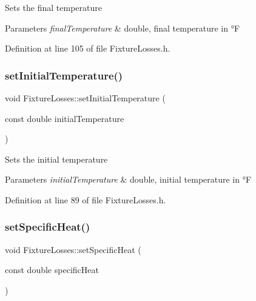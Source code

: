 Sets the final temperature 
\begin{DoxyParams}{Parameters}
{\em final\+Temperature} & double, final temperature in °F \\
\hline
\end{DoxyParams}


Definition at line 105 of file Fixture\+Losses.\+h.

\mbox{\label{class_fixture_losses_ad3f2a1013dc5da103f2bcfc1357a449b}} 
\subsubsection{\texorpdfstring{set\+Initial\+Temperature()}{setInitialTemperature()}}
{\footnotesize\ttfamily void Fixture\+Losses\+::set\+Initial\+Temperature (\begin{DoxyParamCaption}\item[{const double}]{initial\+Temperature }\end{DoxyParamCaption})\hspace{0.3cm}{\ttfamily [inline]}}

Sets the initial temperature 
\begin{DoxyParams}{Parameters}
{\em initial\+Temperature} & double, initial temperature in °F \\
\hline
\end{DoxyParams}


Definition at line 89 of file Fixture\+Losses.\+h.

\mbox{\label{class_fixture_losses_a946e4b6da1cca9f27e57f97688499ee1}} 
\subsubsection{\texorpdfstring{set\+Specific\+Heat()}{setSpecificHeat()}}
{\footnotesize\ttfamily void Fixture\+Losses\+::set\+Specific\+Heat (\begin{DoxyParamCaption}\item[{const double}]{specific\+Heat }\end{DoxyParamCaption})\hspace{0.3cm}{\ttfamily [inline]}}


